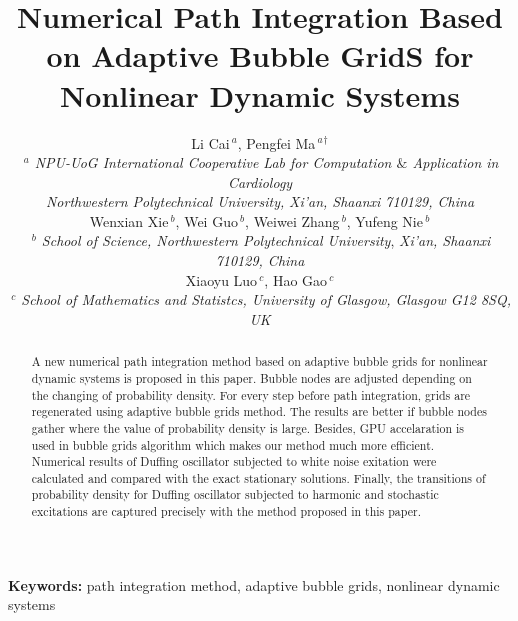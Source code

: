 \documentclass[a4paper, 11pt, final]{article}
\begin{document}
\title
{Numerical Path Integration Based on Adaptive Bubble GridS
 for Nonlinear Dynamic Systems
  }

\author{{Li Cai$^{\ a}$, Pengfei Ma$^{\ a}$$^{\dag}$ }\\
{\small \it $^{\ a}$ NPU-UoG International Cooperative Lab for Computation ${\&}$ Application in Cardiology}\\
{\small \it Northwestern Polytechnical University, }{\small \it Xi'an, Shaanxi 710129, China}\\
{Wenxian Xie$^{\ b}$, Wei Guo$^{\ b}$, Weiwei Zhang$^{\ b}$, {Yufeng Nie$^{\ b}$}}\\
{\small \it $^{\ b}$ School of Science, Northwestern Polytechnical University},
{\small \it Xi'an, Shaanxi 710129, China}\\
{Xiaoyu Luo$^{\ c}$, Hao Gao$^{\ c}$}\\
{\small \it $^{\ c}$ School of Mathematics and Statistcs, University of Glasgow, Glasgow G12 8SQ, UK}
}
\date{}
\maketitle
\pagestyle{myheadings} 
\begin{abstract}
    A new numerical path integration method based on adaptive bubble grids
   for nonlinear dynamic systems is proposed in this paper. 
   Bubble nodes are adjusted depending on the changing of probability density.
   For every step before path integration, grids are regenerated using adaptive bubble
   grids method. The results are better if bubble nodes gather where the
   value of probability density is large.
   Besides, GPU accelaration is used in bubble grids algorithm which makes our 
   method much more efficient. Numerical results of Duffing
   oscillator subjected to white noise exitation were calculated and compared with
   the exact stationary solutions. Finally, the transitions of probability density
   for Duffing oscillator subjected to harmonic and stochastic excitations are
   captured precisely with the method proposed in this paper.

\end{abstract}
{\bf Keywords:}\quad\/ 
path integration method, adaptive bubble grids, nonlinear dynamic systems
\maketitle
\end{document}

